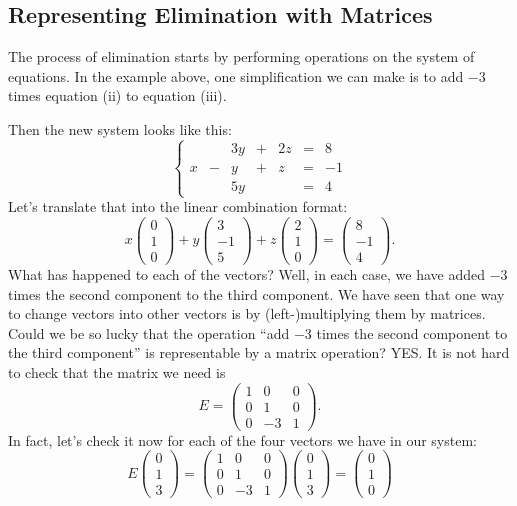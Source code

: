 \documentclass[11pt]{amsart}
\theoremstyle{definition}
\begin{document}
\subsection*{Representing Elimination with Matrices}

The process of elimination starts by performing operations on the system of equations. In the example above, one simplification we can make is to add $-3$ times equation (ii) to equation (iii).

Then the new system looks like this:
\[
\left\{ \begin{array}{rrrrrrr}
    &   & 3y & + & 2z & = & 8 \\
  x & - &  y & + &  z & = & -1 \\
    &   & 5y &   &    & = & 4
\end{array}\right.
\]
Let's translate that into the linear combination format:
\[
x \begin{pmatrix} 0 \\ 1 \\ 0 \end{pmatrix} +
y \begin{pmatrix} 3 \\ -1 \\ 5 \end{pmatrix} +
z \begin{pmatrix} 2 \\ 1 \\ 0 \end{pmatrix} =
\begin{pmatrix} 8 \\ -1 \\ 4 \end{pmatrix} .
\]
What has happened to each of the vectors? Well, in each case, we have added $-3$ times the second component to the third component.
We have seen that one way to change vectors into other vectors is by (left-)multiplying them by matrices. Could we be so lucky that the operation ``add $-3$ times the second component to the third component'' is representable by a matrix operation? YES. It is not hard to check that the matrix we need is
\[
E = \begin{pmatrix} 1 & 0 & 0 \\ 0 & 1 & 0 \\ 0 & -3 & 1 \end{pmatrix} .
\]
In fact, let's check it now for each of the four vectors we have in our system:
\[
E \begin{pmatrix} 0 \\ 1 \\ 3 \end{pmatrix} =
\begin{pmatrix} 1 & 0 & 0 \\ 0 & 1 & 0 \\ 0 & -3 & 1 \end{pmatrix} \begin{pmatrix} 0 \\ 1 \\ 3 \end{pmatrix} = \begin{pmatrix} 0 \\ 1 \\ 0 \end{pmatrix}
\]
\end{document}
